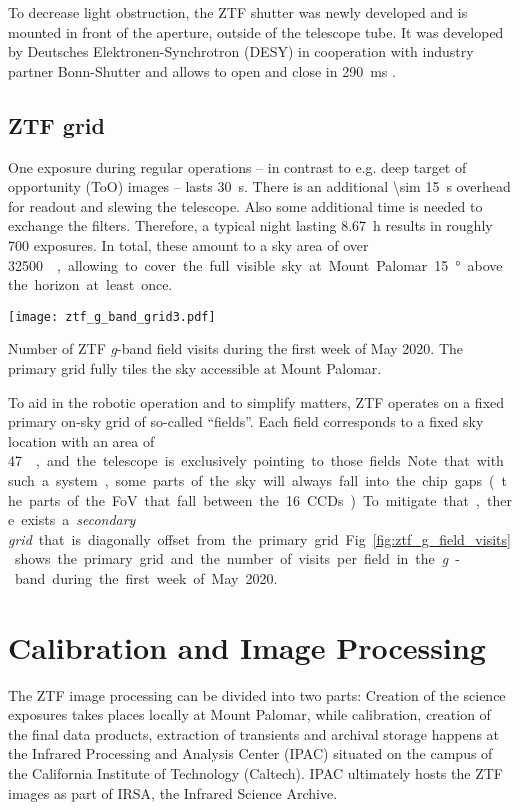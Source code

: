 To decrease light obstruction, the ZTF shutter was newly developed and is mounted in front of the aperture, outside of the telescope tube. It was developed by Deutsches Elektronen-Synchrotron (DESY) in cooperation with industry partner Bonn-Shutter and allows to open and close in \SI{290}{\milli \second} \cite{Dekany2020}.

\subsection{ZTF grid} \label{ztf_grid}
One exposure during regular operations -- in contrast to e.g. deep target of opportunity (ToO) images -- lasts \SI{30}{\second}. There is an additional \SI{\sim 15}{\second} overhead for readout and slewing the telescope. Also some additional time is needed to exchange the filters. Therefore, a typical night lasting \SI{8.67}{\hour}  results in roughly 700 exposures. In total, these amount to a sky area of over \SI{32500}{\square\deg}, allowing to cover the full visible sky at Mount Palomar \SI{15}{\degree} above the horizon at least once.

\begin{marginfigure}
    \texttt{[image: ztf\_g\_band\_grid3.pdf]}
    \caption[ZTF field visits]{Number of ZTF \textit{g}-band field visits during the first week of May 2020. The primary grid fully tiles the sky accessible at Mount Palomar.}
\end{marginfigure}

To aid in the robotic operation and to simplify matters, ZTF operates on a fixed primary on-sky grid of so-called ``fields''. Each field corresponds to a fixed sky location with an area of \SI{47}{\square\deg}, and the telescope is exclusively pointing to those fields. Note that with such a system, some parts of the sky will always fall into the chip gaps (the parts of the FoV that fall between the 16 CCDs). To mitigate that, there exists a \textit{secondary grid} that is diagonally offset from the primary grid. Fig. \ref{fig:ztf_g_field_visits} shows the primary grid and the number of visits per field in the \textit{g}-band during the first week of May 2020.

\section{Calibration and Image Processing}
The ZTF image processing can be divided into two parts: Creation of the science exposures takes places locally at Mount Palomar, while calibration, creation of the final data products, extraction of transients and archival storage happens at the Infrared Processing and Analysis Center (IPAC) situated on the campus of the California Institute of Technology (Caltech). IPAC ultimately hosts the ZTF images as part of IRSA, the Infrared Science Archive.

